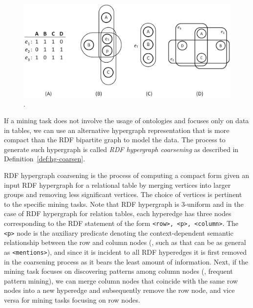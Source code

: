 
\begin{figure}[tbh]
\centering
\includegraphics[width=\textwidth]{fig/hypergraph-coarsening.eps}
\caption{\label{fig:hypergraph-coarsening} .}
\end{figure}

If a mining task does not involve the usage of ontologies and focuses only on data in tables, we can use an alternative hypergraph representation that is more compact than the RDF bipartite graph to model the data. The process to generate such hypergraph is called \emph{RDF hypergraph coarsening} as described in Definition~\ref{def:hg-coarsen}.
 
\begin{mydef}
\label{def:hg-coarsen}
RDF hypergraph coarsening is the process of computing a compact form given an input RDF hypergraph for a relational table by merging vertices into larger groups and removing less significant vertices. The choice of vertices is pertinent to the specific mining tasks. Note that RDF hypergraph is 3-uniform and in the case of RDF hypergraph for relation tables, each hyperedge has three nodes corresponding to the RDF statement of the form \texttt{<row>, <p>, <column>}. The \texttt{<p>} node is the auxiliary predicate denoting the context-dependent semantic relationship between the row and column nodes (\eg, such as that can be as general as \texttt{<mentions>}), and since it is incident to all RDF hyperedges it is first removed in the coarsening process as it bears the least amount of information. Next, if the mining task focuses on discovering patterns among column nodes (\eg, frequent pattern mining), we can merge column nodes that coincide with the same row nodes into a new hyperedge and subsequently remove the row node, and vice versa for mining tasks focusing on row nodes. 
\end{mydef}

